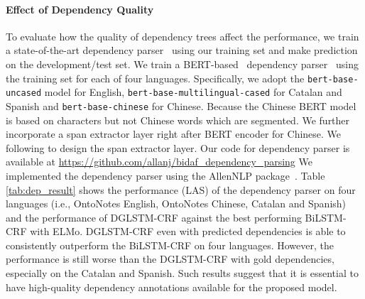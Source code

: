 





\paragraph{Effect of Dependency Quality}
To evaluate how the quality of dependency trees affect the performance, we train a state-of-the-art dependency parser~\cite{dozat2017deep} using our training set and make prediction on the development/test set. 
We train a BERT-based~\cite{devlin2019bert} dependency parser~\cite{dozat2017deep} using the training set for each of four languages. 
Specifically, we adopt the \texttt{bert-base-uncased} model for English, \texttt{bert-base-multilingual-cased} for Catalan and Spanish and \texttt{bert-base-chinese} for Chinese.
Because the Chinese BERT model is based on characters but not Chinese words which are segmented. 
We further incorporate a span extractor layer right after BERT encoder for Chinese. 
We following \citet{lee2017end} to design the span extractor layer. Our code for dependency parser is available at \url{https://github.com/allanj/bidaf_dependency_parsing}
We implemented the dependency parser using the AllenNLP package~\cite{Gardner2017AllenNLP}.
Table \ref{tab:dep_result} shows the performance (LAS) of the dependency parser on four languages (i.e., OntoNotes English, OntoNotes Chinese, Catalan and Spanish) and the performance of DGLSTM-CRF against the best performing BiLSTM-CRF with ELMo.
DGLSTM-CRF even with predicted dependencies is able to consistently outperform the BiLSTM-CRF on four languages. 
However, the performance is still worse than the DGLSTM-CRF with gold dependencies, especially on the Catalan and Spanish.
Such results suggest that it is essential to have high-quality dependency annotations available for the proposed model.

